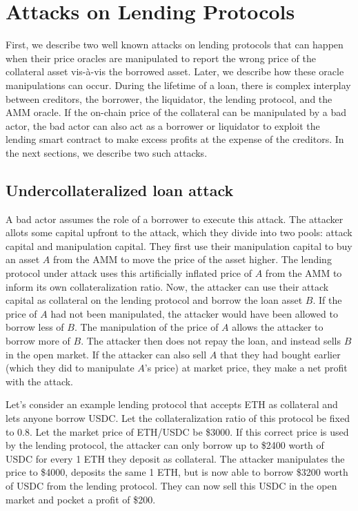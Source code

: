 \section{Attacks on Lending Protocols}
First, we describe two well known attacks on lending protocols that can happen when their price oracles are manipulated to report the wrong price of the collateral asset vis-à-vis the borrowed asset. Later, we describe how these oracle manipulations can occur. During the lifetime of a loan, there is complex interplay between creditors, the borrower, the liquidator, the lending protocol, and the AMM oracle. If the on-chain price of the collateral can be manipulated by a bad actor, the bad actor can also act as a borrower or liquidator to exploit the lending smart contract to make excess profits at the expense of the creditors. In the next sections, we describe two such attacks.

\subsection{Undercollateralized loan attack \label{SectionUndercollAttack}}
A bad actor assumes the role of a borrower to execute this attack. The attacker allots some capital upfront to the attack, which they divide into two pools: attack capital and manipulation capital. They first use their manipulation capital to buy an asset $A$ from the AMM to move the price of the asset higher. The lending protocol under attack uses this artificially inflated price of $A$ from the AMM to inform its own collateralization ratio. Now, the attacker can use their attack capital as collateral on the lending protocol and borrow the loan asset $B$. If the price of $A$ had not been manipulated, the attacker would have been allowed to borrow less of $B$. The manipulation of the price of $A$ allows the attacker to borrow more of $B$. The attacker then does not repay the loan, and instead sells $B$ in the open market. If the attacker can also sell $A$ that they had bought earlier (which they did to manipulate $A$'s price) at market price, they make a net profit with the attack.

Let's consider an example lending protocol that accepts ETH as collateral and lets anyone borrow USDC. Let the collateralization ratio of this protocol be fixed to 0.8. Let the market price of ETH/USDC be \$3000. If this correct price is used by the lending protocol, the attacker can only borrow up to \$2400 worth of USDC for every 1 ETH they deposit as collateral. The attacker manipulates the price to \$4000, deposits the same 1 ETH, but is now able to borrow \$3200 worth of USDC from the lending protocol. They can now sell this USDC in the open market and pocket a profit of \$200. 

